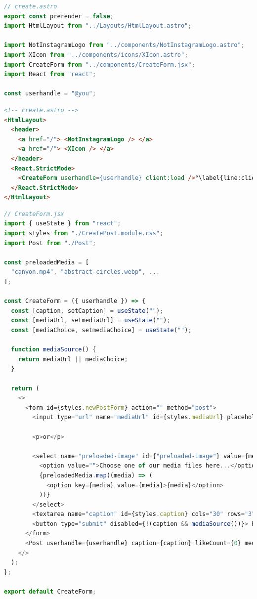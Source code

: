 \documentclass[a4paper, 10pt]{article}
\begin{document}
\begin{lstlisting}[caption=Create page in Astro (Frontmatter), label={lst:Astro:Create:Script}, language=JavaScript]
// create.astro 
export const prerender = false;
import HtmlLayout from "../Layouts/HtmlLayout.astro";
  
import NotInstagramLogo from "../components/NotInstagramLogo.astro";
import XIcon from "../components/icons/XIcon.astro";
import CreateForm from "../components/CreateForm.jsx";
import React from "react";

const userhandle = "@you";
\end{lstlisting}

\begin{lstlisting}[caption=Create page in Astro (HTML), label={lst:Astro:Create:HTML}, language=HTML, firstnumber=11, escapechar=°]
<!-- create.astro -->
<HtmlLayout>
  <header>
    <a href="/"> <NotInstagramLogo /> </a>
    <a href="/"> <XIcon /> </a>
  </header>
  <React.StrictMode>
    <CreateForm userhandle={userhandle} client:load />°\label{line:clientLoad}°
  </React.StrictMode>
</HtmlLayout>
\end{lstlisting}
    
\begin{lstlisting}[caption=Create form in Astro, label={lst:Astro:Createform}, language=JavaScript]
// CreateForm.jsx
import { useState } from "react";
import styles from "./CreatePost.module.css";
import Post from "./Post";

const preloadedMedia = [
  "canyon.mp4", "abstract-circles.webp", ...
];

const CreateForm = ({ userhandle }) => {
  const [caption, setCaption] = useState("");
  const [mediaUrl, setmediaUrl] = useState("");
  const [mediaChoice, setmediaChoice] = useState("");

  function mediaSource() {
    return mediaUrl || mediaChoice;
  }

  return (
    <>
      <form id={styles.newPostForm} action="" method="post">
        <input type="url" name="mediaUrl" id={styles.mediaUrl} placeholder="Insert your media URL here..." value={mediaUrl} onChange={(event) => setmediaUrl(event.target.value)} />

        <p>or</p>

        <select name="preloaded-image" id={"preloaded-image"} value={mediaChoice} onChange={(event) => setmediaChoice(event.target.value)}>
          <option value="">Choose one of our media files here...</option>
          {preloadedMedia.map((media) => (
            <option key={media} value={media}>{media}</option>
          ))}
        </select>
        <textarea name="caption" id={styles.caption} cols="30" rows="3" placeholder="Type your caption here" value={caption} onChange={(event) => setCaption(event.target.value)}/>
        <button type="submit" disabled={!(caption && mediaSource())}> Post it! </button>
      </form>
      <Post userhandle={userhandle} caption={caption} likeCount={0} mediaSource={mediaSource()} hideActionIcons={true} />
    </>
  );
};

export default CreateForm;
\end{lstlisting}
\end{document}
